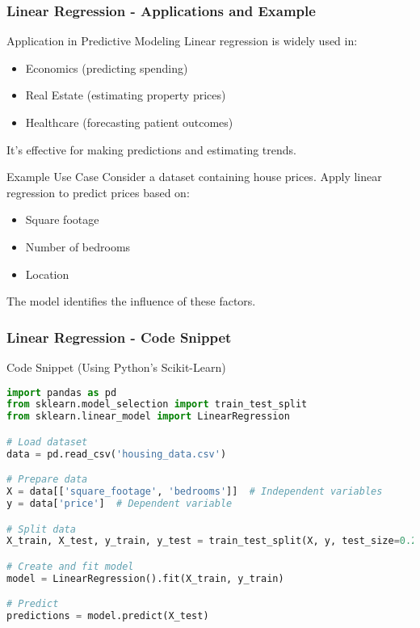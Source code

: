 \documentclass[aspectratio=169]{beamer}
\begin{document}
\begin{frame}[fragile]
    \frametitle{Linear Regression - Applications and Example}
    \begin{block}{Application in Predictive Modeling}
        Linear regression is widely used in:
        \begin{itemize}
            \item Economics (predicting spending)
            \item Real Estate (estimating property prices)
            \item Healthcare (forecasting patient outcomes)
        \end{itemize}
        It's effective for making predictions and estimating trends.
    \end{block}

    \begin{block}{Example Use Case}
        Consider a dataset containing house prices. Apply linear regression to predict prices based on:
        \begin{itemize}
            \item Square footage
            \item Number of bedrooms
            \item Location
        \end{itemize}
        The model identifies the influence of these factors.
    \end{block}
\end{frame}

\begin{frame}[fragile]
    \frametitle{Linear Regression - Code Snippet}
    \begin{block}{Code Snippet (Using Python's Scikit-Learn)}
    \begin{lstlisting}[language=Python]
import pandas as pd
from sklearn.model_selection import train_test_split
from sklearn.linear_model import LinearRegression

# Load dataset
data = pd.read_csv('housing_data.csv')

# Prepare data
X = data[['square_footage', 'bedrooms']]  # Independent variables
y = data['price']  # Dependent variable

# Split data
X_train, X_test, y_train, y_test = train_test_split(X, y, test_size=0.2, random_state=42)

# Create and fit model
model = LinearRegression().fit(X_train, y_train)

# Predict
predictions = model.predict(X_test)
    \end{lstlisting}
    \end{block}
\end{frame}
\end{document}
